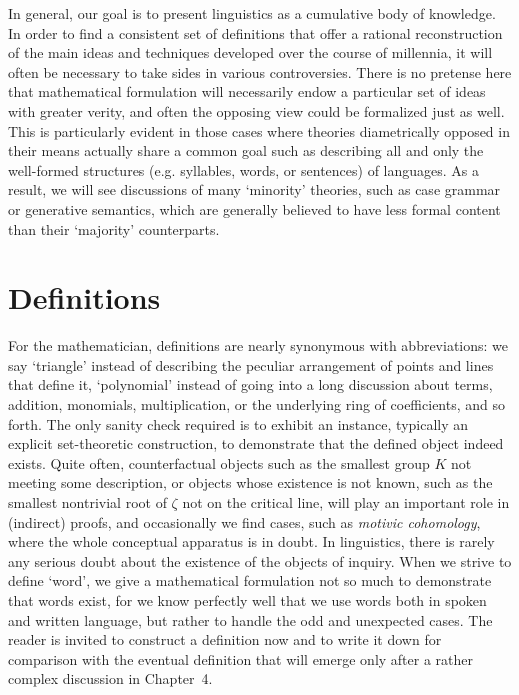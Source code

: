 In general, our goal is to present linguistics as a cumulative body of
knowledge.  In order to find a consistent set of definitions that offer a
rational reconstruction of the main ideas and techniques developed over the
course of millennia, it will often be necessary to take sides in various
controversies. There is no pretense here that mathematical formulation will
necessarily endow a particular set of ideas with greater verity, and often the
opposing view could be formalized just as well. This is particularly evident
in those cases where theories diametrically opposed in their means actually
share a common goal such as describing all and only the well-formed structures
(e.g. syllables, words, or sentences) of languages. As a result, we will see
discussions of many `minority' theories, such as case grammar or generative
semantics, which are generally believed to have less formal content than their
`majority' counterparts. 

\section{Definitions}

For the mathematician, definitions are nearly synonymous with abbreviations: we
say `triangle' instead of describing the peculiar arrangement of points and
lines that define it, `polynomial' instead of going into a long discussion
about terms, addition, monomials, multiplication, or the underlying ring of
coefficients, and so forth.  The only sanity check required is to exhibit an
instance, typically an explicit set-theoretic construction, to demonstrate
that the defined object indeed exists. Quite often, counterfactual objects
such as the smallest group $K$ not meeting some description, or objects whose
existence is not known, such as the smallest nontrivial root of $\zeta$ not on
the critical line, will play an important role in (indirect) proofs, and
occasionally we find cases, such as {\it motivic cohomology}, where the whole
conceptual apparatus is in doubt.  In linguistics, there is rarely any serious
doubt about the existence of the objects of inquiry. When we strive to define
`word', we give a mathematical formulation not so much to demonstrate that
words exist, for we know perfectly well that we use words both in spoken
and written language, but rather to handle the odd and unexpected cases. The
reader is invited to construct a definition now and to write it down for
comparison with the eventual definition that will emerge only after a rather
complex discussion in Chapter~4. 


